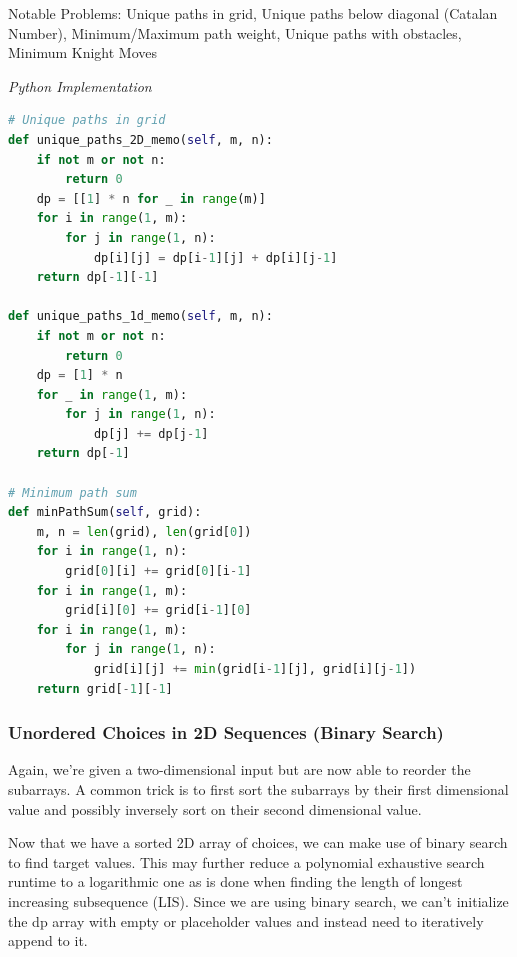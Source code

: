 \documentclass{article}
\newcommand{\comment}[1]{}
\begin{document}
Notable Problems: Unique paths in grid, Unique paths below diagonal (Catalan Number), Minimum/Maximum path weight, Unique paths with obstacles, Minimum Knight Moves

\vspace{8pt} \emph{Python Implementation}
\begin{lstlisting}[language=Python]
# Unique paths in grid
def unique_paths_2D_memo(self, m, n):
    if not m or not n:
        return 0
    dp = [[1] * n for _ in range(m)]
    for i in range(1, m):
        for j in range(1, n):
            dp[i][j] = dp[i-1][j] + dp[i][j-1]
    return dp[-1][-1]

def unique_paths_1d_memo(self, m, n):
    if not m or not n:
        return 0
    dp = [1] * n
    for _ in range(1, m):
        for j in range(1, n):
            dp[j] += dp[j-1]
    return dp[-1]
    
# Minimum path sum
def minPathSum(self, grid):
    m, n = len(grid), len(grid[0])
    for i in range(1, n):
        grid[0][i] += grid[0][i-1]
    for i in range(1, m):
        grid[i][0] += grid[i-1][0]
    for i in range(1, m):
        for j in range(1, n):
            grid[i][j] += min(grid[i-1][j], grid[i][j-1])
    return grid[-1][-1]
\end{lstlisting}

\subsubsection*{Unordered Choices in 2D Sequences (Binary Search)}

\comment{
def bisect_left(A, val):
    lo, hi = 0, len(A) - 1
    while lo <= hi:
        mid = (lo + hi) //2
        if A[mid] < val:
            lo = mid + 1
        elif val < A[mid]:
            hi = mid - 1
        else:
            return mid
    return lo
}
Again, we're given a two-dimensional input but are now able to reorder the subarrays. A common trick is to first sort the subarrays by their first dimensional value and possibly inversely sort on their second dimensional value. 

Now that we have a sorted 2D array of choices, we can make use of binary search to find target values. This may further reduce a polynomial exhaustive search runtime to a logarithmic one as is done when finding the length of longest increasing subsequence (LIS). Since we are using binary search, we can't initialize the dp array with empty or placeholder values and instead need to iteratively append to it. 
\end{document}

